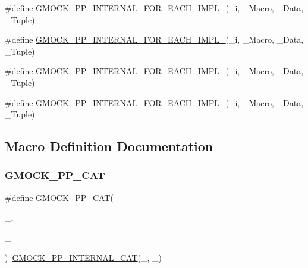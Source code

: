 \begin{DoxyCompactItemize}
\item 
\#define \mbox{\hyperlink{googletest-master_2googlemock_2include_2gmock_2internal_2gmock-pp_8h_a70e6ea8b4a366244b729e56b3c2b0988}{G\+M\+O\+C\+K\+\_\+\+P\+P\+\_\+\+I\+N\+T\+E\+R\+N\+A\+L\+\_\+\+F\+O\+R\+\_\+\+E\+A\+C\+H\+\_\+\+I\+M\+P\+L\+\_}}(\+\_\+i,  \+\_\+\+Macro,  \+\_\+\+Data,  \+\_\+\+Tuple)
\item 
\#define \mbox{\hyperlink{googletest-master_2googlemock_2include_2gmock_2internal_2gmock-pp_8h_ac43d06ac5ac29ce5b40e570c3c8b53ee}{G\+M\+O\+C\+K\+\_\+\+P\+P\+\_\+\+I\+N\+T\+E\+R\+N\+A\+L\+\_\+\+F\+O\+R\+\_\+\+E\+A\+C\+H\+\_\+\+I\+M\+P\+L\+\_}}(\+\_\+i,  \+\_\+\+Macro,  \+\_\+\+Data,  \+\_\+\+Tuple)
\item 
\#define \mbox{\hyperlink{googletest-master_2googlemock_2include_2gmock_2internal_2gmock-pp_8h_a73de321e9dd5117fdd32520525296b60}{G\+M\+O\+C\+K\+\_\+\+P\+P\+\_\+\+I\+N\+T\+E\+R\+N\+A\+L\+\_\+\+F\+O\+R\+\_\+\+E\+A\+C\+H\+\_\+\+I\+M\+P\+L\+\_}}(\+\_\+i,  \+\_\+\+Macro,  \+\_\+\+Data,  \+\_\+\+Tuple)
\item 
\#define \mbox{\hyperlink{googletest-master_2googlemock_2include_2gmock_2internal_2gmock-pp_8h_ab9670ce2eb23a136b2978041d6f36f1b}{G\+M\+O\+C\+K\+\_\+\+P\+P\+\_\+\+I\+N\+T\+E\+R\+N\+A\+L\+\_\+\+F\+O\+R\+\_\+\+E\+A\+C\+H\+\_\+\+I\+M\+P\+L\+\_}}(\+\_\+i,  \+\_\+\+Macro,  \+\_\+\+Data,  \+\_\+\+Tuple)
\end{DoxyCompactItemize}


\subsection{Macro Definition Documentation}
\mbox{\label{googletest-master_2googlemock_2include_2gmock_2internal_2gmock-pp_8h_a108c52ffa81ab99348d23b8fa76fded3}} 
\subsubsection{\texorpdfstring{GMOCK\_PP\_CAT}{GMOCK\_PP\_CAT}}
{\footnotesize\ttfamily \#define G\+M\+O\+C\+K\+\_\+\+P\+P\+\_\+\+C\+AT(\begin{DoxyParamCaption}\item[{}]{\+\_,  }\item[{}]{\+\_ }\end{DoxyParamCaption})~\mbox{\hyperlink{_obj__test_2lib_2googletest-master_2googlemock_2include_2gmock_2internal_2gmock-pp_8h_a2b034c776c832e3d951f5d123658a7ba}{G\+M\+O\+C\+K\+\_\+\+P\+P\+\_\+\+I\+N\+T\+E\+R\+N\+A\+L\+\_\+\+C\+AT}}(\+\_, \+\_)}

